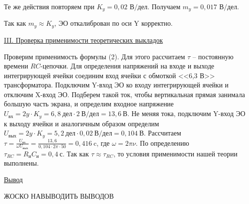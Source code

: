 \documentclass{article}
\begin{document}
Те же действия повторяем при $K_y = 0,02\text{ В/дел}$. Получаем $m_y=0,017\text{ В/дел}$.

Так как $m_y \approx K_y$, ЭО откалиброван по оси Y корректно.

\begin{center}
    \underline{\large {\RN{3}. Проверка применимости теоретических выкладок}}
\end{center}

Проверим применимость формулы (2). Для этого рассчитаем $\tau$ -- постоянную времени $ RC $-цепочки. Для определения напряжений на входе и выходе интегрирующей ячейки соединим вход ячейки с обмоткой <<6,3 В>> трансформатора. Подключим Y-вход ЭО ко входу интегрирующей ячейки и отключим X-вход ЭО. Подберем такой ток, чтобы вертикальная прямая занимала большую часть экрана, и определим входное напряжение $U_{\text{вх}}=2y\cdot K_y=6,8\ \text{дел} \cdot 2\ \text{В/дел}=13,6\ \text{В}$. Не меняя тока, подключим Y-вход ЭО к выходу ячейки и аналогичным образом определим $U_{\text{вых}}=2y\cdot K_y=5,2\ \text{дел} \cdot 0,02\ \text{В/дел}=0,104\ \text{В}$. Рассчитаем $\tau=\frac{U_{\text{вх}}}{\omega U_{\text{вых}}}=\frac{13,6}{0,104\cdot2\pi\cdot 50}=0,416\ \text{c}$, где $\omega=2\pi\nu$. По определению $\tau_{RC}=R_\text{и}C_\text{и}=0,4\ \text{с}$. Так как $\tau\approx\tau_{RC}$, то условия применимости нашей теории выполнены.

\begin{center}
    \raggedleft
        \underline{\underline{\LARGE {Вывод}}}
\end{center}

\begin{center}
    \LARGE{ЖОСКО НАВЫВОДИТЬ ВЫВОДОВ}
\end{center}
\end{document}
